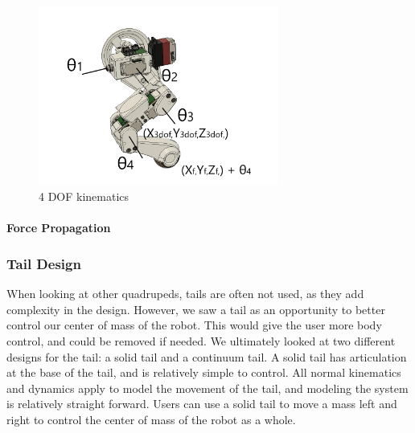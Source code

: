             \begin{figure}[H]
                    \centering
                    \includegraphics[width=0.7\textwidth]{figures/4dofkinematics.png}
                    \caption{4 DOF kinematics}
                    \label{fig:4dofkinematics}
                \end{figure}  
                
             \paragraph{Force Propagation} 
                
        
        \subsubsection{Tail Design}
            When looking at other quadrupeds, tails are often not used, as they add complexity in the design. However, we saw a tail as an opportunity to better control our center of mass of the robot. This would give the user more body control, and could be removed if needed. We ultimately looked at two different designs for the tail: a solid tail and a continuum tail. A solid tail has articulation at the base of the tail, and is relatively simple to control. All normal kinematics and dynamics apply to model the movement of the tail, and modeling the system is relatively straight forward. Users can use a solid tail to move a mass left and right to control the center of mass of the robot as a whole.

